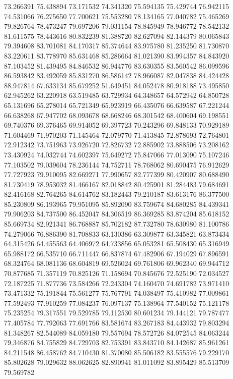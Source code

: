 73.266391
75.438894
73.171532
74.341320
75.594135
75.429744
76.942115
74.531066
76.275650
77.700621
75.553280
78.134165
77.040782
75.465269
79.826764
78.473247
79.697206
79.031154
78.845949
78.946772
78.542132
81.611575
78.443616
80.832239
81.388720
82.627094
82.144379
80.065843
79.394608
83.701081
84.170317
85.374644
83.975780
81.235250
81.730870
83.220611
83.778970
85.631468
85.286664
81.021390
83.994357
84.843920
87.103452
81.439495
84.846532
86.944776
83.630355
83.560542
86.099596
86.593842
83.492059
85.831270
86.586142
78.966087
82.047838
84.424428
88.947814
67.633134
85.679252
51.649451
84.052478
80.918188
73.495850
62.945262
63.220918
63.519485
63.729934
64.348657
64.572942
64.850728
65.131696
65.278014
65.721349
65.923919
66.435076
66.639587
67.221244
66.638268
67.947702
68.093678
68.668246
68.301542
68.400604
69.198551
69.740376
69.376465
69.914052
69.397723
70.243296
69.848133
70.929189
71.604469
71.970203
71.145464
72.079770
71.413845
72.878693
72.764801
72.912342
73.751963
73.926720
72.826732
72.885902
73.888506
73.208162
73.430924
74.032744
74.602397
75.649272
75.847066
77.013090
75.107246
77.103502
79.039604
78.236144
74.752711
78.768062
80.690475
76.912629
77.727923
79.910095
82.669271
77.990657
82.777399
80.420907
80.688490
81.730419
78.953032
81.466167
82.018842
80.425901
81.284483
79.684691
82.416168
82.764265
84.614762
83.182443
79.210187
83.613176
86.377500
85.230809
86.193965
79.951095
85.892090
83.759674
84.680285
84.439341
79.906203
84.737500
86.452047
84.306519
86.369285
83.874204
85.618152
85.669734
82.921341
86.768887
85.702182
87.732780
78.630980
81.100786
74.279066
76.886390
81.708833
63.130386
63.309877
63.345821
63.873434
64.315426
64.455563
64.406972
64.733856
65.053281
65.508430
65.316949
65.988172
66.535710
66.711447
66.837874
67.482906
67.194029
67.896591
68.324764
68.081136
68.604819
69.526024
69.761806
69.962340
69.944712
70.877685
71.357119
70.825126
71.158694
70.845676
72.525190
72.034527
72.187225
71.877736
73.584266
72.243304
74.160470
74.691782
73.971410
73.471332
75.191844
75.561277
75.767791
74.038497
75.410982
77.009861
77.592493
77.910259
77.084237
76.097137
75.138964
77.540152
75.121178
75.235254
79.317551
79.529785
79.112530
80.601234
79.144121
79.787477
77.405784
77.792063
77.691766
83.581674
83.267183
84.443932
79.803294
81.348267
82.544089
84.059180
79.557694
78.572726
84.072545
84.063244
79.346876
84.755829
84.729703
82.753391
83.843710
84.142687
85.961261
84.211548
86.458762
84.710430
81.370080
85.506182
83.555576
79.229170
85.802628
79.029632
88.062625
82.890941
81.011092
83.895429
85.513709
79.569782
